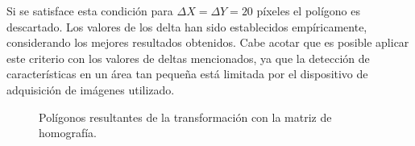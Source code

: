 Si se satisface esta condición 
para $\Delta X = \Delta Y = 20$ píxeles el polígono es descartado. Los valores de los delta han sido establecidos empíricamente, considerando los mejores resultados obtenidos. Cabe acotar que es posible aplicar este criterio con los valores de deltas mencionados, ya que la detección de características en un área tan pequeña está limitada por el dispositivo de adquisición de imágenes utilizado. 
\begin{figure}[tbhp]
	\centering
	\hspace{0.1\linewidth}
	\hspace{0.1\linewidth}
	\caption[Polígonos resultantes de la transformación con la matriz de homografía]{Polígonos resultantes de la transformación con la matriz de homografía.}
	\label{fig:analisis_poligonos}                %
\end{figure}
